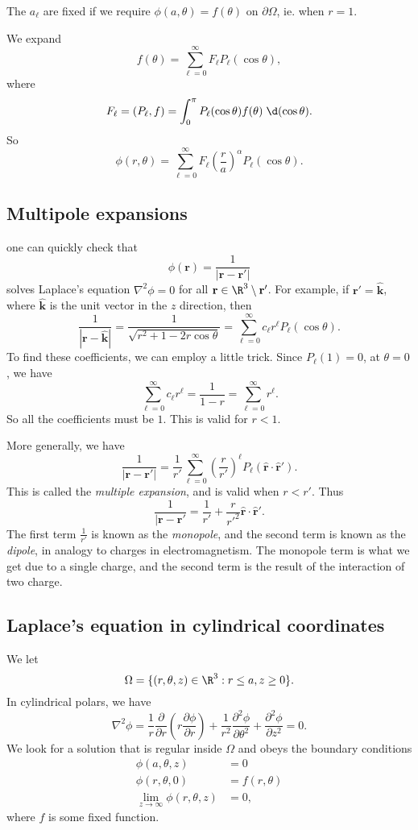 \documentclass[a4paper]{article}
\begin{document}
The $a_\ell$ are fixed if we require $\phi(a, \theta) = f(\theta)$ on $\partial \Omega$, ie. when $r = 1$.

We expand
\[
  f(\theta) = \sum_{\ell = 0}^\infty F_\ell P_\ell(\cos \theta),
\]
where
\[
  F_\ell = (P_\ell, f) = \int_0^\pi P_{\ell}(\cos \theta) f(\theta) \;\d (\cos \theta).
\]
So
\[
  \phi(r, \theta) = \sum_{\ell = 0}^\infty F_\ell \left(\frac{r}{a}\right)^\alpha P_\ell(\cos \theta).
\]
\subsection{Multipole expansions}
one can quickly check that
\[
  \phi(\mathbf{r}) = \frac{1}{|\mathbf{r} - \mathbf{r}'|}
\]
solves Laplace's equation $\nabla^2 \phi = 0$ for all $\mathbf{r}\in \R^3 \setminus \mathbf{r}'$. For example, if $\mathbf{r}' = \hat{\mathbf{k}}$, where $\hat{\mathbf{k}}$ is the unit vector in the $z$ direction, then
\[
  \frac{1}{|\mathbf{r} - \hat{\mathbf{k}}|} = \frac{1}{\sqrt{r^2 + 1 - 2r \cos \theta}} = \sum_{\ell = 0}^\infty c_\ell r^\ell P_\ell(\cos \theta).
\]
To find these coefficients, we can employ a little trick. Since $P_\ell(1) = 0$, at $\theta = 0$, we have
\[
  \sum_{\ell = 0}^\infty c_\ell r^\ell = \frac{1}{1 - r} = \sum_{\ell = 0}^\infty r^\ell.
\]
So all the coefficients must be $1$. This is valid for $r < 1$.

More generally, we have
\[
  \frac{1}{|\mathbf{r} - \mathbf{r}'|} = \frac{1}{r'} \sum_{\ell = 0}^\infty \left(\frac{r}{r'}\right)^\ell P_\ell(\hat{\mathbf{r}}\cdot \hat{\mathbf{r}}').
\]
This is called the \emph{multiple expansion}, and is valid when $r < r'$. Thus
\[
  \frac{1}{|\mathbf{r} - \mathbf{r}'} = \frac{1}{r'} + \frac{r}{r'^2}\hat{\mathbf{r}}\cdot \hat{\mathbf{r}}'.
\]
The first term $\frac{1}{r'}$ is known as the \emph{monopole}, and the second term is known as the \emph{dipole}, in analogy to charges in electromagnetism. The monopole term is what we get due to a single charge, and the second term is the result of the interaction of two charge. %

\subsection{Laplace's equation in cylindrical coordinates}
We let
\[
  \Omega = \{(r, \theta, z) \in \R^3: r \leq a, z \geq 0\}.
\]
In cylindrical polars, we have
\[
  \nabla^2 \phi = \frac{1}{r}\frac{\partial}{\partial r}\left(r \frac{\partial \phi}{\partial r}\right) + \frac{1}{r^2}\frac{\partial^2 \phi}{\partial \theta^2} + \frac{\partial^2 \phi}{\partial z^2} = 0.
\]
We look for a solution that is regular inside $\Omega$ and obeys the boundary conditions
\begin{align*}
  \phi(a, \theta, z) &= 0\\
  \phi(r, \theta, 0) &= f(r, \theta)\\
  \lim_{z\to \infty} \phi(r, \theta, z) &= 0,
\end{align*}
where $f$ is some fixed function.
\end{document}
